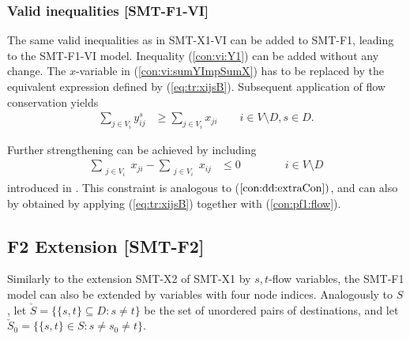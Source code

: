 \subsubsection{Valid inequalities [SMT-F1-VI]}
The same valid inequalities as in SMT-X1-VI can be added to SMT-F1, leading to the SMT-F1-VI model. Inequality (\ref{con:vi:Y1}) can be added without any change. The $x$-variable in (\ref{con:vi:sumYImpSumX}) has to be replaced by the equivalent expression defined by (\ref{eq:tr:xijsB}). Subsequent application of flow conservation yields
\begin{subequations}[resume]
\begin{flalign}
\label{con:vi:sumYImpSumXTrans} \sum\limits_{j\in V_i }y^{s}_{ij} & \geq \sum\limits_{j\in V_i}  x_{ji}  \quad\quad   i\in V\setminus D, s\in D. 
\end{flalign}
\end{subequations}
 
Further strengthening can be achieved by including 
\begin{subequations}[resume]
\begin{flalign}
\label{con:pf1:flowX}  \sum\limits_{\substack{ j\in V_i }}x_{ji}-\sum\limits_{\substack{j\in V_i}}x_{ij}    & \leq 0    \qquad\qquad			  i\in V\setminus D 
\end{flalign}
\end{subequations}
introduced in \cite{Polzin}. This constraint is analogous to ($\ref{con:dd:extraCon})$, and can also by obtained by applying (\ref{eq:tr:xijsB}) together with (\ref{con:pf1:flow}).
\subsection{F2 Extension [SMT-F2]}
Similarly to the extension SMT-X2 of SMT-X1 by $s,t$-flow variables, the SMT-F1 model can also be extended by variables with four node indices. Analogously to $S$, let $\check{S}=\{\{s,t\}\subseteq D: s\neq t\}$ be the set of unordered pairs of destinations, and let $\check{S}_0=\{\{s,t\}\in S: s\neq s_0\neq t\}$. 
